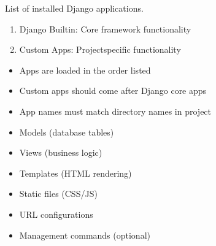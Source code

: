 \documentclass[letterpaper,10pt,english]{sphinxmanual}
\begin{document}
\begin{fulllineitems}
\label{\detokenize{softwareProject:softwareProject.settings.INSTALLED_APPS}}
\pysigstartsignatures
\pysigline
{}
\pysigstopsignatures
\sphinxAtStartPar
List of installed Django applications.
\begin{description}
\begin{enumerate}
%
\item {} 
\sphinxAtStartPar
Django Built\sphinxhyphen{}in: Core framework functionality

\item {} 
\sphinxAtStartPar
Custom Apps: Project\sphinxhyphen{}specific functionality

\end{enumerate}

\begin{itemize}
\item {} 
\sphinxAtStartPar
Apps are loaded in the order listed

\item {} 
\sphinxAtStartPar
Custom apps should come after Django core apps

\item {} 
\sphinxAtStartPar
App names must match directory names in project

\end{itemize}

\begin{itemize}
\item {} 
\sphinxAtStartPar
Models (database tables)

\item {} 
\sphinxAtStartPar
Views (business logic)

\item {} 
\sphinxAtStartPar
Templates (HTML rendering)

\item {} 
\sphinxAtStartPar
Static files (CSS/JS)

\item {} 
\sphinxAtStartPar
URL configurations

\item {} 
\sphinxAtStartPar
Management commands (optional)

\end{itemize}

\end{description}

\end{fulllineitems}
\end{document}
